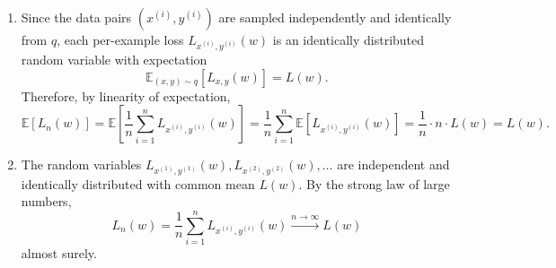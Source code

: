 \documentclass[11pt]{article}
\newcommand{\E}{\mathbb{E}}
\begin{document}
\begin{solution}
\begin{enumerate}
    \item
        Since the data pairs $(x^{(i)}, y^{(i)})$ are sampled independently and
        identically from $q$, each per-example loss $L_{x^{(i)},y^{(i)}}(w)$ is
        an identically distributed random variable with expectation
        \begin{equation*}
            \E_{(x,y)\sim q}[L_{x,y}(w)] = L(w).
        \end{equation*}
        Therefore, by linearity of expectation,
        \begin{equation*}
            \E[L_n(w)]
            = \E\left[\frac{1}{n}\sum_{i=1}^n L_{x^{(i)},y^{(i)}}(w)\right]
            = \frac{1}{n}\sum_{i=1}^n \E[L_{x^{(i)},y^{(i)}}(w)]
            = \frac{1}{n} \cdot n \cdot L(w)
            = L(w).
        \end{equation*}

    \item
        The random variables $L_{x^{(1)},y^{(1)}}(w), L_{x^{(2)},y^{(2)}}(w),
        \ldots$ are independent and identically distributed with common mean
        $L(w)$. By the strong law of large numbers,
        \begin{equation*}
            L_n(w)
            = \frac{1}{n}\sum_{i=1}^n L_{x^{(i)},y^{(i)}}(w)
            \xrightarrow{n\to\infty} L(w)
        \end{equation*}
        almost surely. \qedhere
\end{enumerate}
\end{solution}
\end{document}
